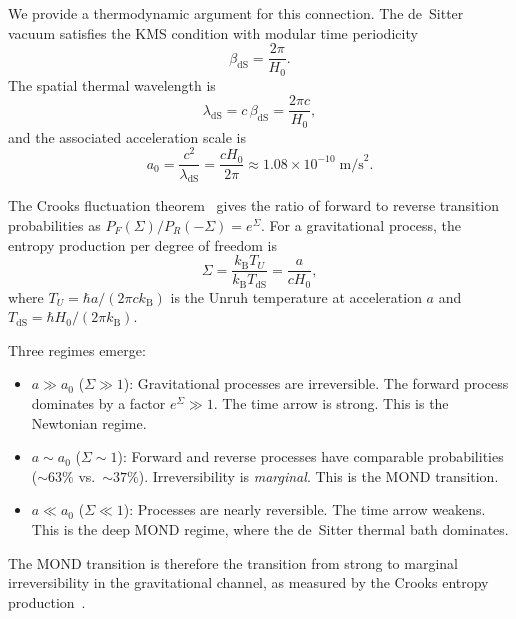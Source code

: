 \documentclass[prd,twocolumn,superscriptaddress,longbibliography,floatfix]{revtex4-2}
\newcommand{\kB}{k_{\mathrm{B}}}
\begin{document}
We provide a thermodynamic argument for this connection.
The de~Sitter vacuum satisfies the KMS condition with modular
time periodicity
\begin{equation}
\beta_{\mathrm{dS}} = \frac{2\pi}{H_0}.
\label{eq:beta_dS}
\end{equation}
The spatial thermal wavelength is
\begin{equation}
\lambda_{\mathrm{dS}} = c\,\beta_{\mathrm{dS}} =
\frac{2\pi c}{H_0},
\label{eq:lambda_dS}
\end{equation}
and the associated acceleration scale is
\begin{equation}
a_0 = \frac{c^2}{\lambda_{\mathrm{dS}}} =
\frac{cH_0}{2\pi} \approx 1.08 \times 10^{-10}\;
\mathrm{m/s}^2.
\label{eq:a0}
\end{equation}

The Crooks fluctuation theorem~\cite{Crooks1999,Kwon2019}
gives the ratio of forward to reverse transition probabilities
as $P_F(\Sigma)/P_R(-\Sigma) = e^\Sigma$.  For a gravitational
process, the entropy production per degree of freedom is
\begin{equation}
\Sigma = \frac{\kB T_U}{\kB T_{\mathrm{dS}}} =
\frac{a}{cH_0},
\label{eq:sigma_a}
\end{equation}
where $T_U = \hbar a/(2\pi c \kB)$ is the Unruh temperature
at acceleration $a$ and
$T_{\mathrm{dS}} = \hbar H_0/(2\pi \kB)$.

Three regimes emerge:
\begin{itemize}
\item $a \gg a_0$ ($\Sigma \gg 1$):
Gravitational processes are irreversible.
The forward process dominates by a factor $e^\Sigma \gg 1$.
The time arrow is strong.  This is the Newtonian regime.

\item $a \sim a_0$ ($\Sigma \sim 1$):
Forward and reverse processes have comparable probabilities
($\sim\!63\%$ vs.\ $\sim\!37\%$).  Irreversibility is
\emph{marginal}.  This is the MOND transition.

\item $a \ll a_0$ ($\Sigma \ll 1$):
Processes are nearly reversible.
The time arrow weakens.  This is the deep MOND regime,
where the de~Sitter thermal bath dominates.
\end{itemize}

The MOND transition is therefore the transition from
strong to marginal irreversibility in the gravitational
channel, as measured by the Crooks entropy
production~\cite{BassoCeleri2025}.
\end{document}
